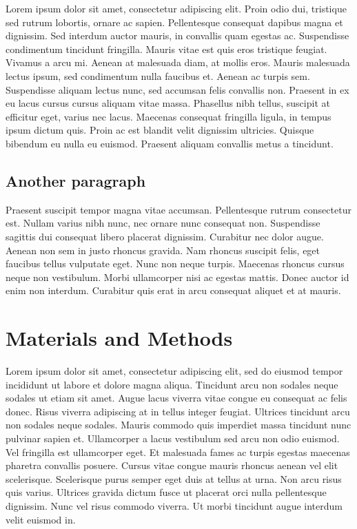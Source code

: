 \documentclass[
]{article}
\begin{document}
Lorem ipsum dolor sit amet, consectetur adipiscing elit. Proin odio dui, tristique sed rutrum lobortis, ornare ac sapien. Pellentesque consequat dapibus magna et dignissim. Sed interdum auctor mauris, in convallis quam egestas ac. Suspendisse condimentum tincidunt fringilla. Mauris vitae est quis eros tristique feugiat. Vivamus a arcu mi. Aenean at malesuada diam, at mollis eros. Mauris malesuada lectus ipsum, sed condimentum nulla faucibus et. Aenean ac turpis sem. Suspendisse aliquam lectus nunc, sed accumsan felis convallis non. Praesent in ex eu lacus cursus cursus aliquam vitae massa. Phasellus nibh tellus, suscipit at efficitur eget, varius nec lacus. Maecenas consequat fringilla ligula, in tempus ipsum dictum quis. Proin ac est blandit velit dignissim ultricies. Quisque bibendum eu nulla eu euismod. Praesent aliquam convallis metus a tincidunt.

\hypertarget{another-paragraph}{%
\subsection{Another paragraph}\label{another-paragraph}}

Praesent suscipit tempor magna vitae accumsan. Pellentesque rutrum consectetur est. Nullam varius nibh nunc, nec ornare nunc consequat non. Suspendisse sagittis dui consequat libero placerat dignissim. Curabitur nec dolor augue. Aenean non sem in justo rhoncus gravida. Nam rhoncus suscipit felis, eget faucibus tellus vulputate eget. Nunc non neque turpis. Maecenas rhoncus cursus neque non vestibulum. Morbi ullamcorper nisi ac egestas mattis. Donec auctor id enim non interdum. Curabitur quis erat in arcu consequat aliquet et at mauris.

\hypertarget{materials-and-methods}{%
\section{Materials and Methods}\label{materials-and-methods}}

Lorem ipsum dolor sit amet, consectetur adipiscing elit, sed do eiusmod tempor incididunt ut labore et dolore magna aliqua. Tincidunt arcu non sodales neque sodales ut etiam sit amet. Augue lacus viverra vitae congue eu consequat ac felis donec. Risus viverra adipiscing at in tellus integer feugiat. Ultrices tincidunt arcu non sodales neque sodales. Mauris commodo quis imperdiet massa tincidunt nunc pulvinar sapien et. Ullamcorper a lacus vestibulum sed arcu non odio euismod. Vel fringilla est ullamcorper eget. Et malesuada fames ac turpis egestas maecenas pharetra convallis posuere. Cursus vitae congue mauris rhoncus aenean vel elit scelerisque. Scelerisque purus semper eget duis at tellus at urna. Non arcu risus quis varius. Ultrices gravida dictum fusce ut placerat orci nulla pellentesque dignissim. Nunc vel risus commodo viverra. Ut morbi tincidunt augue interdum velit euismod in.
\end{document}
